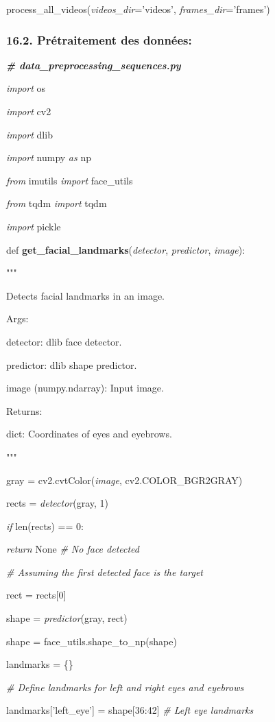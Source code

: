 \documentclass[
]{article}
\begin{document}
process\_all\_videos(\emph{videos\_dir}='videos', \emph{frames\_dir}='frames')

\hypertarget{pruxe9traitement-des-donnuxe9es}{%
\subsubsection{16.2. Prétraitement des données:}\label{pruxe9traitement-des-donnuxe9es}}

\emph{\textbf{\# data\_preprocessing\_sequences.py}}

\emph{import} os

\emph{import} cv2

\emph{import} dlib

\emph{import} numpy \emph{as} np

\emph{from} imutils \emph{import} face\_utils

\emph{from} tqdm \emph{import} tqdm

\emph{import} pickle

def \textbf{get\_facial\_landmarks}(\emph{detector}, \emph{predictor}, \emph{image}):

"""

Detects facial landmarks in an image.

Args:

detector: dlib face detector.

predictor: dlib shape predictor.

image (numpy.ndarray): Input image.

Returns:

dict: Coordinates of eyes and eyebrows.

"""

gray = cv2.cvtColor(\emph{image}, cv2.COLOR\_BGR2GRAY)

rects = \emph{detector}(gray, 1)

\emph{if} len(rects) == 0:

\emph{return} None \emph{\# No face detected}

\emph{\# Assuming the first detected face is the target}

rect = rects{[}0{]}

shape = \emph{predictor}(gray, rect)

shape = face\_utils.shape\_to\_np(shape)

landmarks = \{\}

\emph{\# Define landmarks for left and right eyes and eyebrows}

landmarks{[}'left\_eye'{]} = shape{[}36:42{]} \emph{\# Left eye landmarks}
\end{document}
